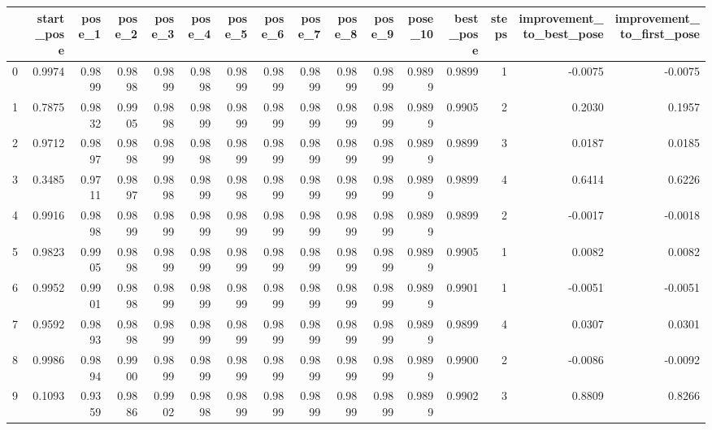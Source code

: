 \begin{tabular}{lrrrrrrrrrrrrrrr}
\toprule
{} &  start\_pose &  pose\_1 &  pose\_2 &  pose\_3 &  pose\_4 &  pose\_5 &  pose\_6 &  pose\_7 &  pose\_8 &  pose\_9 &  pose\_10 &  best\_pose &  steps &  improvement\_to\_best\_pose &  improvement\_to\_first\_pose \\
\midrule
0  &      0.9974 &  0.9899 &  0.9898 &  0.9899 &  0.9898 &  0.9899 &  0.9899 &  0.9899 &  0.9899 &  0.9899 &   0.9899 &     0.9899 &      1 &                   -0.0075 &                    -0.0075 \\
1  &      0.7875 &  0.9832 &  0.9905 &  0.9898 &  0.9899 &  0.9899 &  0.9899 &  0.9899 &  0.9899 &  0.9899 &   0.9899 &     0.9905 &      2 &                    0.2030 &                     0.1957 \\
2  &      0.9712 &  0.9897 &  0.9898 &  0.9899 &  0.9898 &  0.9899 &  0.9899 &  0.9899 &  0.9899 &  0.9899 &   0.9899 &     0.9899 &      3 &                    0.0187 &                     0.0185 \\
3  &      0.3485 &  0.9711 &  0.9897 &  0.9898 &  0.9899 &  0.9898 &  0.9899 &  0.9899 &  0.9899 &  0.9899 &   0.9899 &     0.9899 &      4 &                    0.6414 &                     0.6226 \\
4  &      0.9916 &  0.9898 &  0.9899 &  0.9899 &  0.9899 &  0.9899 &  0.9899 &  0.9899 &  0.9899 &  0.9899 &   0.9899 &     0.9899 &      2 &                   -0.0017 &                    -0.0018 \\
5  &      0.9823 &  0.9905 &  0.9898 &  0.9899 &  0.9899 &  0.9899 &  0.9899 &  0.9899 &  0.9899 &  0.9899 &   0.9899 &     0.9905 &      1 &                    0.0082 &                     0.0082 \\
6  &      0.9952 &  0.9901 &  0.9898 &  0.9899 &  0.9899 &  0.9899 &  0.9899 &  0.9899 &  0.9899 &  0.9899 &   0.9899 &     0.9901 &      1 &                   -0.0051 &                    -0.0051 \\
7  &      0.9592 &  0.9893 &  0.9898 &  0.9899 &  0.9899 &  0.9899 &  0.9899 &  0.9899 &  0.9899 &  0.9899 &   0.9899 &     0.9899 &      4 &                    0.0307 &                     0.0301 \\
8  &      0.9986 &  0.9894 &  0.9900 &  0.9899 &  0.9899 &  0.9899 &  0.9899 &  0.9899 &  0.9899 &  0.9899 &   0.9899 &     0.9900 &      2 &                   -0.0086 &                    -0.0092 \\
9  &      0.1093 &  0.9359 &  0.9886 &  0.9902 &  0.9898 &  0.9899 &  0.9899 &  0.9899 &  0.9899 &  0.9899 &   0.9899 &     0.9902 &      3 &                    0.8809 &                     0.8266 \\

\end{tabular}
